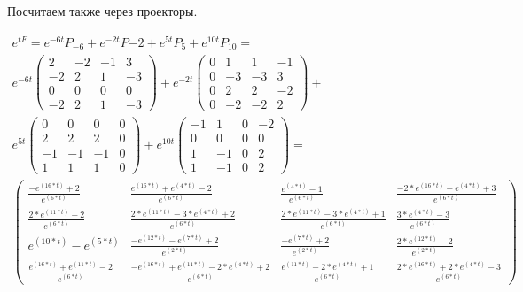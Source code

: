 \documentclass[12pt, a4paper]{article}
\begin{document}
    Посчитаем также через проекторы.

    \begin{multline}
        e^{t F} = e^{-6t} P_{-6} + e^{-2t} P{-2} + e^{5t} P_{5} + e^{10t} P_{10} = \\
        e^{-6t} \left(\begin{matrix}
            2 & -2 & -1 & 3 \\
            -2 & 2 & 1 & -3 \\
            0 & 0 & 0 & 0 \\
            -2 & 2 & 1 & -3
        \end{matrix}\right) + e^{-2t} \left(\begin{matrix}
            0 & 1 & 1 & -1 \\
            0 & -3 & -3 & 3 \\
            0 & 2 & 2 & -2 \\
            0 & -2 & -2 & 2
        \end{matrix}\right) + \\
         e^{5t} \left(\begin{matrix}
            0 & 0 & 0 & 0 \\
            2 & 2 & 2 & 0 \\
            -1 & -1 & -1 & 0 \\
            1 & 1 & 1 & 0
        \end{matrix}\right) + e^{10t} \left(\begin{matrix}
            -1 & 1 & 0 & -2 \\
            0 & 0 & 0 & 0 \\
            1 & -1 & 0 & 2 \\
            1 & -1 & 0 & 2
        \end{matrix}\right) = \\
        \left(\begin{matrix}
            \frac{-e^\left(16*t\right)+2}{e^\left(6*t\right)} & \frac{e^\left(16*t\right)+e^\left(4*t\right)-2}{e^\left(6*t\right)} & \frac{e^\left(4*t\right)-1}{e^\left(6*t\right)} & \frac{-2*e^\left(16*t\right)-e^\left(4*t\right)+3}{e^\left(6*t\right)} \\
            \frac{2*e^\left(11*t\right)-2}{e^\left(6*t\right)} & \frac{2*e^\left(11*t\right)-3*e^\left(4*t\right)+2}{e^\left(6*t\right)} & \frac{2*e^\left(11*t\right)-3*e^\left(4*t\right)+1}{e^\left(6*t\right)} & \frac{3*e^\left(4*t\right)-3}{e^\left(6*t\right)} \\
            e^\left(10*t\right)-e^\left(5*t\right) & \frac{-e^\left(12*t\right)-e^\left(7*t\right)+2}{e^\left(2*t\right)} & \frac{-e^\left(7*t\right)+2}{e^\left(2*t\right)} & \frac{2*e^\left(12*t\right)-2}{e^\left(2*t\right)} \\
            \frac{e^\left(16*t\right)+e^\left(11*t\right)-2}{e^\left(6*t\right)} & \frac{-e^\left(16*t\right)+e^\left(11*t\right)-2*e^\left(4*t\right)+2}{e^\left(6*t\right)} & \frac{e^\left(11*t\right)-2*e^\left(4*t\right)+1}{e^\left(6*t\right)} & \frac{2*e^\left(16*t\right)+2*e^\left(4*t\right)-3}{e^\left(6*t\right)}
        \end{matrix}\right)
    \end{multline}
\end{document}
